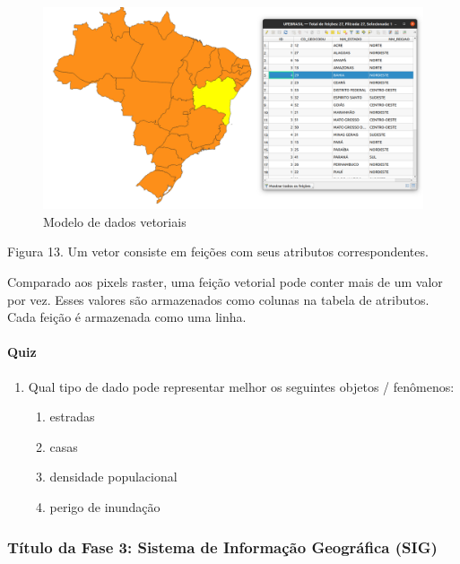 \documentclass[
]{book}
\providecommand{\tightlist}{%
  \setlength{\itemsep}{0pt}\setlength{\parskip}{0pt}}
\begin{document}
\begin{figure}
\centering
\includegraphics{media/modulo0/vector.png}
\caption{Modelo de dados vetoriais}
\end{figure}

Figura 13. Um vetor consiste em feições com seus atributos correspondentes.

Comparado aos pixels raster, uma feição vetorial pode conter mais de um valor por vez. Esses valores são armazenados como colunas na tabela de atributos. Cada feição é armazenada como uma linha.

\hypertarget{quiz-1}{%
\paragraph{Quiz}\label{quiz-1}}

\begin{enumerate}
\def\labelenumi{\arabic{enumi}.}
\tightlist
\item
  Qual tipo de dado pode representar melhor os seguintes objetos / fenômenos:

  \begin{enumerate}
  \def\labelenumii{\arabic{enumii}.}
  \tightlist
  \item
    estradas
  \item
    casas
  \item
    densidade populacional
  \item
    perigo de inundação
  \end{enumerate}
\end{enumerate}

\hypertarget{tuxedtulo-da-fase-3-sistema-de-informauxe7uxe3o-geogruxe1fica-sig}{%
\subsubsection{Título da Fase 3: Sistema de Informação Geográfica (SIG)}\label{tuxedtulo-da-fase-3-sistema-de-informauxe7uxe3o-geogruxe1fica-sig}}
\end{document}
